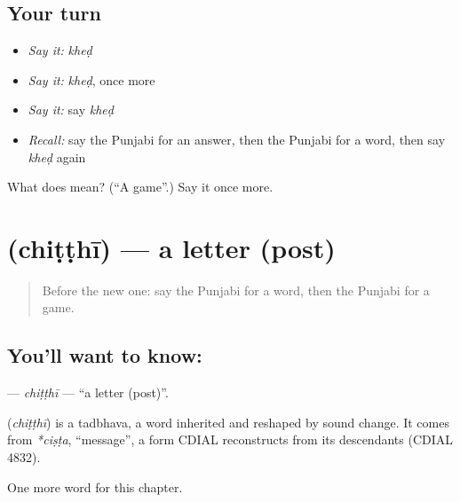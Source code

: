\subsection*{Your turn}
\begin{itemize}
\raggedright
  \item \emph{Say it:} \emph{kheḍ}
  \item \emph{Say it:} \emph{kheḍ}, once more
  \item \emph{Say it:} say \emph{kheḍ}
  \item \emph{Recall:} say the Punjabi for an answer, then the Punjabi for a word, then say \emph{kheḍ} again
\end{itemize}

\begin{tcolorbox}[breakable,colback=teal!4,colframe=teal!35!black,title={Before you move on}]
What does  mean? (\textquotedblleft{}A game\textquotedblright{}.) Say it once more.
\end{tcolorbox}
\section[\texorpdfstring{\pa{ਚਿੱਠੀ} (chiṭṭhī)}{ਚਿੱਠੀ (chiṭṭhī)}]{ (chiṭṭhī) — a letter (post)}

\label{lesson:PA-C73-chitthi}



\begin{quote}
Before the new one: say the Punjabi for a word, then the Punjabi for a game.
\end{quote}

\subsection*{You'll want to know: }
\textbf{} — \emph{chiṭṭhī} — \textquotedblleft{}a letter (post)\textquotedblright{}.

\begin{cousinweb}
\textbf{} (\emph{chiṭṭhī}) is a tadbhava, a word inherited and reshaped by sound change. It comes from \emph{*ciṣṭa}, \textquotedblleft{}message\textquotedblright{}, a form CDIAL reconstructs from its descendants (CDIAL 4832).
\end{cousinweb}

\begin{grammarlens}[title={What you've built}]
One more word for this chapter.
\end{grammarlens}

